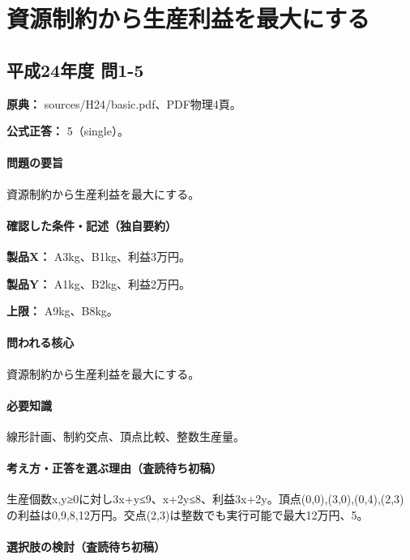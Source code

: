 \section{資源制約から生産利益を最大にする}

\subsection{平成24年度 問1-5}
\label{q:h24-reg-basic-1-5}

\noindent\textbf{原典：} sources/H24/basic.pdf、PDF物理4頁。

\textbf{公式正答：} 5（single）。

\paragraph{問題の要旨} 資源制約から生産利益を最大にする。

\paragraph{確認した条件・記述（独自要約）}\mbox{}\par

\noindent\textbf{製品X：} A3kg、B1kg、利益3万円。\par

\noindent\textbf{製品Y：} A1kg、B2kg、利益2万円。\par

\noindent\textbf{上限：} A9kg、B8kg。\par

\paragraph{問われる核心} 資源制約から生産利益を最大にする。

\paragraph{必要知識} 線形計画、制約交点、頂点比較、整数生産量。

\paragraph{考え方・正答を選ぶ理由（査読待ち初稿）} 生産個数x,y≥0に対し3x+y≤9、x+2y≤8、利益3x+2y。頂点(0,0),(3,0),(0,4),(2,3)の利益は0,9,8,12万円。交点(2,3)は整数でも実行可能で最大12万円、5。

\paragraph{選択肢の検討（査読待ち初稿）}\mbox{}\par

